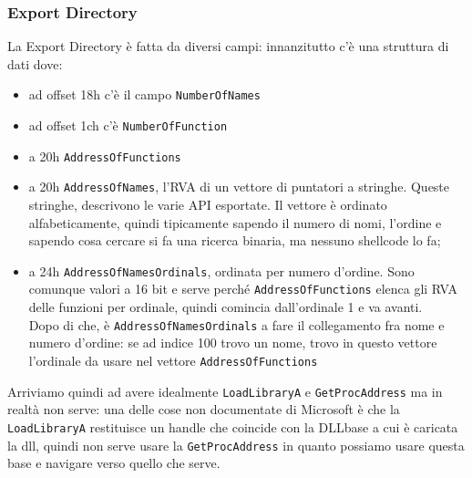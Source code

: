 \documentclass[12pt, oneside]{extbook}
\begin{document}
\subsubsection{Export Directory}
La Export Directory è fatta da diversi campi: innanzitutto c'è una struttura di dati dove:
\begin{itemize}
	\item ad offset 18h c'è il campo \texttt{NumberOfNames}
	\item ad offset 1ch c'è \texttt{NumberOfFunction}
	\item a 20h \texttt{AddressOfFunctions}
	\item a 20h \texttt{AddressOfNames}, l'RVA di un vettore di puntatori a stringhe. Queste stringhe, descrivono le varie API esportate. Il vettore è ordinato alfabeticamente, quindi tipicamente sapendo il numero di nomi, l'ordine e sapendo cosa cercare si fa una ricerca binaria, ma nessuno shellcode lo fa;
	\item a 24h \texttt{AddressOfNamesOrdinals}, ordinata per numero d'ordine. Sono comunque valori a 16 bit e serve perché \texttt{AddressOfFunctions} elenca gli RVA delle funzioni per ordinale, quindi comincia dall'ordinale 1 e va avanti.\\Dopo di che, è \texttt{AddressOfNamesOrdinals} a fare il collegamento fra nome e numero d'ordine: se ad indice 100 trovo un nome, trovo in questo vettore l'ordinale da usare nel vettore \texttt{AddressOfFunctions}
\end{itemize}
Arriviamo quindi ad avere idealmente \texttt{LoadLibraryA} e \texttt{GetProcAddress} ma in realtà non serve: una delle cose non documentate di Microsoft è che la \texttt{LoadLibraryA} restituisce un handle che coincide con la DLLbase a cui è caricata la dll, quindi non serve usare la \texttt{GetProcAddress} in quanto possiamo usare questa base e navigare verso quello che serve.
\end{document}
